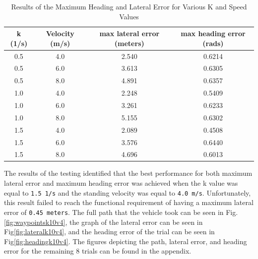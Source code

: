\documentclass[titlepage]{article}
\begin{document}
{\begin{table}
	\centering
	\begin{tabular}{| c | c | c | c |}
		\hline
		k (1/s) & Velocity (m/s) & max lateral error (meters) & max heading error (rads) \\ [0.5ex]
		\hline
		0.5     & 4.0            & 2.540                      & 0.6214                   \\
		\hline
		0.5     & 6.0            & 3.613                      & 0.6305                   \\
		\hline
		0.5     & 8.0            & 4.891                      & 0.6357                   \\
		\hline
		1.0     & 4.0            & 2.248                      & 0.5409                   \\
		\hline
		1.0     & 6.0            & 3.261                      & 0.6233                   \\
		\hline
		1.0     & 8.0            & 5.155                      & 0.6302                   \\
		\hline
		1.5     & 4.0            & 2.089                      & 0.4508                   \\
		\hline
		1.5     & 6.0            & 3.576                      & 0.6440                   \\
		\hline
		1.5     & 8.0            & 4.696                      & 0.6013                   \\
		\hline
	\end{tabular}
	\caption{Results of the Maximum Heading and Lateral Error for Various K and Speed Values}
	\label{tab:controller_test_values}
\end{table}

The results of the testing identified that the best performance for both maximum lateral error and maximum heading error was achieved when the k value was equal to \texttt{1.5 1/s} and the standing velocity was equal to \texttt{4.0 m/s}. Unfortunately, this result failed to reach the functional requirement of having a maximum lateral error of \texttt{0.45 meters}. The full path that the vehicle took can be seen in Fig.\ref{fig:waypointsk10v4}, the graph of the lateral error can be seen in Fig\ref{fig:lateralk10v4}, and the heading error of the trial can be seen in Fig\ref{fig:headingk10v4}. The figures depicting the path, lateral error, and heading error for the remaining 8 trials can be found in the appendix.

}
\end{document}
